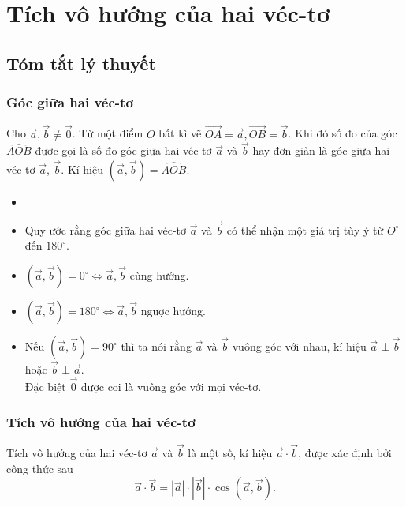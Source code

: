 \setcounter{dang}{0}
\section{Tích vô hướng của hai véc-tơ}
\subsection{Tóm tắt lý thuyết}
\subsubsection{Góc giữa hai véc-tơ}
Cho $\overrightarrow{a}, \overrightarrow{b} \neq \overrightarrow{0}$. Từ một điểm $O$ bất kì vẽ $\overrightarrow{OA} = \overrightarrow{a}, \overrightarrow{OB} = \overrightarrow{b}$.
Khi đó số đo của góc $\widehat{AOB}$ được gọi là số đo góc giữa hai véc-tơ $\overrightarrow{a}$ và $\overrightarrow{b}$ hay đơn giản là góc giữa hai véc-tơ $\overrightarrow{a}$, $\overrightarrow{b}$. Kí hiệu $\left(\overrightarrow{a}, \overrightarrow{b}\right) = \widehat{AOB}$.
\begin{note}
	\begin{itemize}
		\item []
		\item Quy ước rằng góc giữa hai véc-tơ $\overrightarrow{a}$ và $\overrightarrow{b}$ có thể nhận một giá trị tùy ý từ $O^\circ$ đến $180^\circ$.
		\item $\left(\overrightarrow{a}, \overrightarrow{b}\right) = 0^\circ \Leftrightarrow \overrightarrow{a}, \overrightarrow{b}$ cùng hướng.
		\item $\left(\overrightarrow{a}, \overrightarrow{b}\right) = 180^\circ \Leftrightarrow \overrightarrow{a}, \overrightarrow{b}$ ngược hướng.
		\item Nếu $\left(\overrightarrow{a},\overrightarrow{b}\right) = 90^\circ$ thì ta nói rằng $\overrightarrow{a}$ và $\overrightarrow{b}$ vuông góc với nhau, kí hiệu $\overrightarrow{a}\perp \overrightarrow{b}$ hoặc $\overrightarrow{b}\perp \overrightarrow{a}$.\\
		Đặc biệt $\overrightarrow{0}$ được coi là vuông góc với mọi véc-tơ.
	\end{itemize}
\end{note}
\subsubsection{Tích vô hướng của hai véc-tơ}
\begin{dn}{}
	Tích vô hướng của hai véc-tơ $\overrightarrow{a}$ và $\overrightarrow{b}$	là một số, kí hiệu $\overrightarrow{a}\cdot \overrightarrow{b}$, được xác định bởi công thức sau
	$$\overrightarrow{a} \cdot \overrightarrow{b} = \left|\overrightarrow{a}\right|\cdot \left|\overrightarrow{b}\right|\cdot \cos \left(\overrightarrow{a}, \overrightarrow{b}\right).$$
\end{dn}

